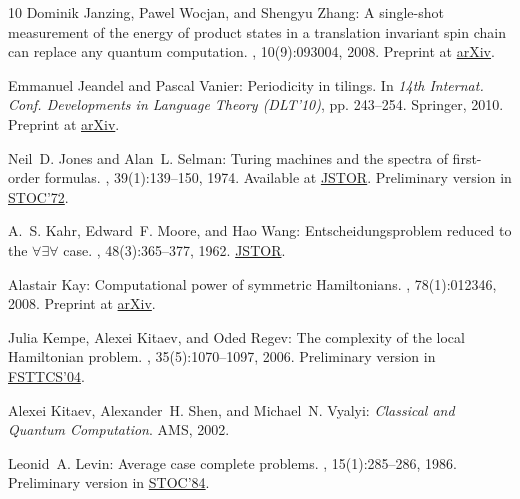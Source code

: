 \begin{thebibliography}{10}
{\sc Dominik Janzing, Pawel Wocjan, and Shengyu Zhang}: A single-shot
  measurement of the energy of product states in a translation invariant spin
  chain can replace any quantum computation.
, 10(9):093004, 2008.
\newblock Preprint at \href{http://arxiv.org/abs/0710.1615}{arXiv}.
\newblock [\epfmtdoi{10.1088/1367-2630/10/9/093004}]

{\sc Emmanuel Jeandel and Pascal Vanier}: Periodicity in tilings.
\newblock In {\em 14th Internat. Conf. Developments in Language Theory
  (DLT'10)}, pp. 243--254. Springer, 2010.
\newblock Preprint at \href{http://arxiv.org/abs/0909.3997}{arXiv}.
\newblock [\epfmtdoi{10.1007/978-3-642-14455-4\_23}]

{\sc Neil~D. Jones and Alan~L. Selman}: Turing machines and the spectra of
  first-order formulas.
, 39(1):139--150, 1974.
\newblock Available at \href{http://www.jstor.org/stable/2272354}{JSTOR}.
  Preliminary version in
  \href{http://dx.doi.org/10.1145/800152.804909}{STOC'72}.

{\sc A.~S. Kahr, Edward~F. Moore, and Hao Wang}: Entscheidungsproblem reduced
  to the {$\forall \exists \forall$} case.
, 48(3):365--377, 1962.
\newblock \href{http://www.jstor.org/stable/71207}{JSTOR}.

{\sc Alastair Kay}: Computational power of symmetric {H}amiltonians.
, 78(1):012346, 2008.
\newblock Preprint at \href{http://arxiv.org/abs/0801.3228}{arXiv}.

{\sc Julia Kempe, Alexei Kitaev, and Oded Regev}: The complexity of the local
  {H}amiltonian problem.
, 35(5):1070--1097, 2006.
\newblock Preliminary version in
  \href{http://dx.doi.org/10.1007/978-3-540-30538-5_31}{FSTTCS'04}.
\newblock [\epfmtdoi{10.1137/S0097539704445226}]

{\sc Alexei Kitaev, Alexander~H. Shen, and Michael~N. Vyalyi}: {\em Classical
  and Quantum Computation}.
\newblock AMS, 2002.

{\sc Leonid~A. Levin}: Average case complete problems.
, 15(1):285--286, 1986.
\newblock Preliminary version in
  \href{http://dx.doi.org/10.1145/800057.808713}{STOC'84}.
\newblock [\epfmtdoi{10.1137/0215020}]


\end{thebibliography}
